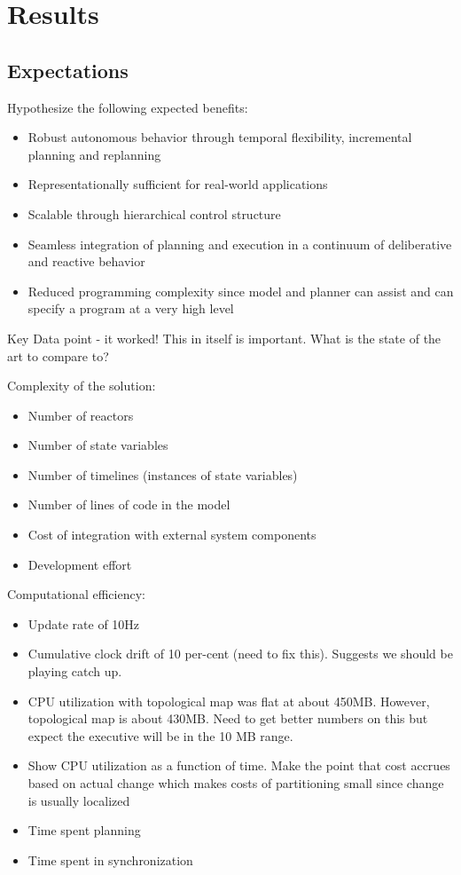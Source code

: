 \documentclass[letterpaper]{article}
\begin{document}
\section{Results}

\subsection{Expectations}
Hypothesize the following expected benefits:
\begin{itemize}
\item Robust autonomous behavior through temporal flexibility, incremental planning and replanning
\item Representationally sufficient for real-world applications
\item Scalable through hierarchical control structure
\item Seamless integration of planning and execution in a continuum of deliberative and reactive behavior
\item Reduced programming complexity since model and planner can assist and can specify a program at a very high level
\end{itemize}

Key Data point - it worked! This in itself is important. What is the state of the art to compare to?

Complexity of the solution:
\begin{itemize}
\item Number of reactors
\item Number of state variables
\item Number of timelines (instances of state variables)
\item Number of lines of code in the model
\item Cost of integration with external system components
\item Development effort
\end{itemize}

Computational efficiency:
\begin{itemize}
\item Update rate of 10Hz
\item Cumulative clock drift of 10 per-cent (need to fix this). Suggests we should be playing catch up.
\item CPU utilization with topological map was flat at about 450MB. However, topological map is about 430MB. Need to get better numbers on this but expect the executive will be in the 10 MB range.
\item Show CPU utilization as a function of time. Make the point that cost accrues based on actual change which makes costs of partitioning small since change is usually localized
\item Time spent planning
\item Time spent in synchronization
\end{itemize}
\end{document}
